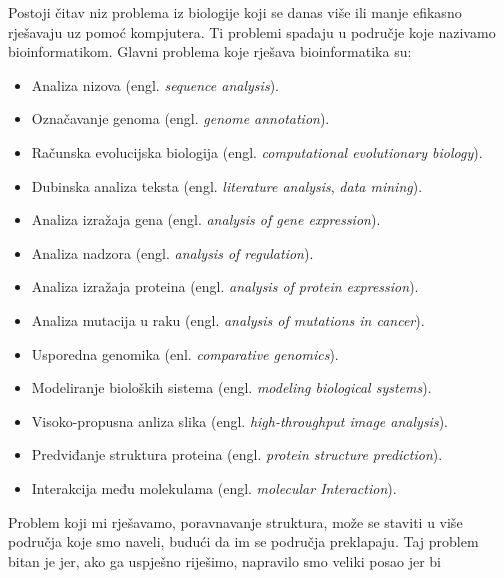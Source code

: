 \documentclass[times, utf8, zavrsni]{fer}
\begin{document}

Postoji čitav niz problema iz biologije koji se danas više ili manje efikasno
rješavaju uz pomoć kompjutera. Ti problemi spadaju u područje koje nazivamo
bioinformatikom. Glavni problema koje rješava bioinformatika su:

\begin{itemize}
\item
Analiza nizova (engl. \textit{sequence analysis}). 

\item
Označavanje genoma (engl. \textit{genome annotation}).

\item
Računska evolucijska biologija (engl. \textit{computational
evolutionary biology}).

\item
Dubinska analiza teksta (engl. \textit{literature analysis}, 
\textit{data mining}).

\item
Analiza izražaja gena (engl. \textit{analysis of gene expression}).

\item
Analiza nadzora (engl. \textit{analysis of regulation}).

\item
Analiza izražaja proteina (engl. \textit{analysis of protein
expression}).

\item
Analiza mutacija u raku (engl. \textit{analysis of mutations in cancer}).

\item
Usporedna genomika (enl. \textit{comparative genomics}).

\item
Modeliranje bioloških sistema (engl. \textit{modeling biological
systems}).

\item
Visoko-propusna anliza slika (engl. \textit{high-throughput
image analysis}).

\item
Predviđanje struktura proteina (engl. \textit{protein structure prediction}).

\item 
Interakcija među molekulama (engl. \textit{molecular Interaction}).
\end{itemize}

Problem koji mi rješavamo, poravnavanje struktura, može se staviti u više 
područja koje smo naveli, budući da im se područja preklapaju. Taj problem
bitan je jer, ako ga uspješno riješimo, napravilo smo veliki posao jer
bi 
\end{document}
